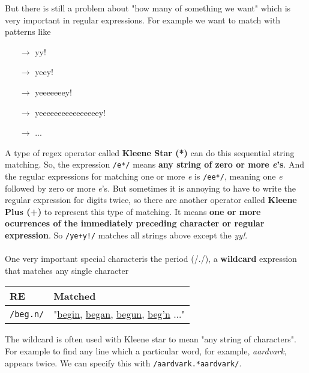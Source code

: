 \documentclass[11pt]{article}
\begin{document}
\renewcommand{\arraystretch}{1}
But there is still a problem about "how many of something we want" which is very important in regular expressions. For example we want to match with patterns like
\begin{itemize}
\item[$\rightarrow$] yy!
\item[$\rightarrow$] yeey!
\item[$\rightarrow$] yeeeeeeey!
\item[$\rightarrow$] yeeeeeeeeeeeeeeeey!
\item[$\rightarrow$] ...
\end{itemize}
A type of regex operator called \textbf{Kleene Star (*)} can do this sequential string matching. So, the expression \texttt{/e*/} means \textbf{any string of zero or more \textit{e}'s}. And the regular expressions for matching one or more \textit{e} is \texttt{/ee*/}, meaning one \textit{e} followed by zero or more \textit{e}'s. But sometimes it is annoying to have to write the regular expression for digits twice, so there are another operator called \textbf{Kleene Plus (+)} to represent this type of matching. It means \textbf{one or more ocurrences of the immediately preceding character or regular expression}. So \texttt{/ye+y!/} matches all strings above except the \textit{yy!}.\\\\
One very important special characteris the period (/./), a \textbf{wildcard} expression that matches any single character 
\renewcommand{\arraystretch}{1.5}
\begin{center}
\begin{tabular}{ |p{4cm}|p{10cm}| }
 \hline
 \hline
 \textbf{RE}& \hspace*{0.6cm}\textbf{Matched} \\
 \hline
 \hline
 \texttt{/beg.n/}   & "\underline{begin}, \underline{began}, \underline{begun}, \underline{beg'n} ..."  \\
 \hline
\end{tabular}
\end{center}
\renewcommand{\arraystretch}{1}
The wildcard is often used with Kleene star to mean "any string of characters". For example to find any line which a particular word, for example, \textit{aardvark}, appears twice. We can specify this with \texttt{/aardvark.*aardvark/}.\\\\
\end{document}
